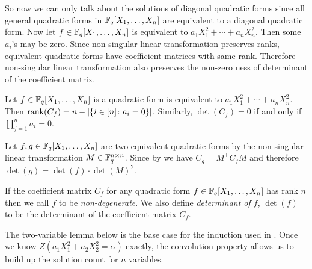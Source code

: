 So now we can only talk about the solutions of diagonal quadratic forms since all general quadratic forms in $\mathbb{F}_q[X_1,\dots,X_n]$ are equivalent to a diagonal quadratic form. Now let $f\in\mathbb{F}_q[X_1,\dots,X_n]$ is equivalent to $a_1X_1^2+\cdots+a_nX_n^2$. Then some $a_i$'s may be zero. Since non-singular linear transformation preserves ranks, equivalent quadratic forms have coefficient matrices with same rank. Therefore non-singular linear transformation also preserves the non-zero ness of determinant of the coefficient matrix. 
\begin{observation}\label{obs:diagonal-rank-det}
  Let $f\in\mathbb{F}_q[X_1,\dots,X_n]$ is a quadratic form is equivalent to $a_1X_1^2+\cdots+a_nX_n^2$. Then $\operatorname{rank}(C_f)=n-|\{i\in[n]\colon a_i=0\}|$. Similarly, $\det(C_f)=0$ if and only if $\prod_{j=1}^na_i=0$. 
\end{observation}
\begin{observation}\label{obs:equivalent-det-value}
  Let $f,g\in\mathbb{F}_q[X_1,\dots,X_n]$ are two equivalent quadratic forms by the non-singular linear transformation $M\in\mathbb{F}_q^{n\times n}$. Since by \QFEquivCoeffObs we have $C_g=M^\top C_f M$ and therefore $\det(g)=\det(f)\cdot \det(M)^2$. 
\end{observation}
If the coefficient matrix $C_f$ for any quadratic form $f\in\mathbb{F}_q[X_1,\dots,X_n]$ has rank $n$ then we call $f$ to be \emph{non-degenerate}. We also define \emph{determinant of $f$}, $\det(f)$ to be the determinant of the coefficient matrix $C_f$. 

The two-variable lemma below is the base case for the induction used in \QFCountOddthm. Once we know $Z(a_1X_1^2+a_2X_2^2=\alpha)$ exactly, the convolution property \QFConvProplem allows us to build up the solution count for $n$ variables.

